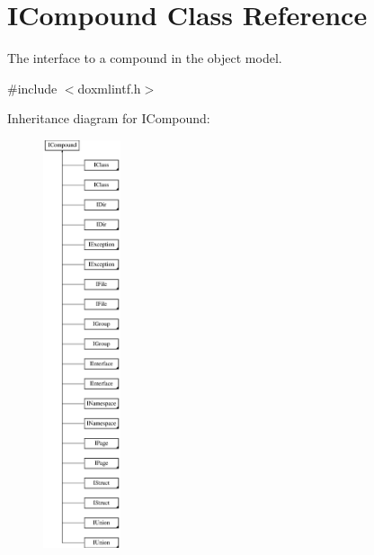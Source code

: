 \hypertarget{class_i_compound}{}\section{I\+Compound Class Reference}
\label{class_i_compound}


The interface to a compound in the object model.  




{\ttfamily \#include $<$doxmlintf.\+h$>$}

Inheritance diagram for I\+Compound\+:\begin{figure}[H]
\begin{center}
\leavevmode
\includegraphics[height=12.000000cm]{class_i_compound}
\end{center}
\end{figure}
